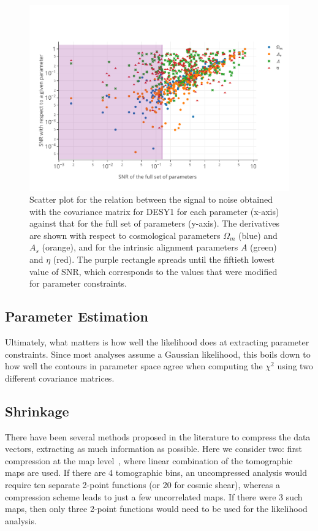 \documentclass[twocolumn]{\docclass}
\begin{document}
\begin{figure}
\includegraphics[width=1\columnwidth]{SNR_cuts.pdf}
\caption{Scatter plot for the relation between the signal to noise obtained with the covariance matrix for DESY1 for each parameter (x-axis) against that for the full set of parameters (y-axis). The derivatives are shown with respect to cosmological parameters $\Omega_m$ (blue) and $A_s$ (orange), and for the intrinsic alignment parameters $A$ (green) and $\eta$ (red). The purple rectangle spreads until the fiftieth lowest value of SNR, which corresponds to the values that were modified for parameter constraints. \label{fig:signalnoise_cuts}}
\end{figure}


\subsection{Parameter Estimation}

Ultimately, what matters is how well the likelihood does at extracting parameter constraints. Since most analyses assume a Gaussian likelihood, this boils down to how well the contours in parameter space agree when computing the $\chi^2$ using two different covariance matrices.

\subsection{Shrinkage}

There have been several methods proposed in the literature to compress the data vectors, extracting as much information as possible. Here we consider two: first compression at the map level~\citep{Alonso:2017hhj}, where linear combination of the tomographic maps are used. If there are 4 tomographic bins, an uncompressed analysis would require ten separate 2-point functions (or 20 for cosmic shear), whereas a compression scheme leads to just a few uncorrelated maps. If there were 3 such maps, then only three 2-point functions would need to be used for the likelihood analysis.
\end{document}
